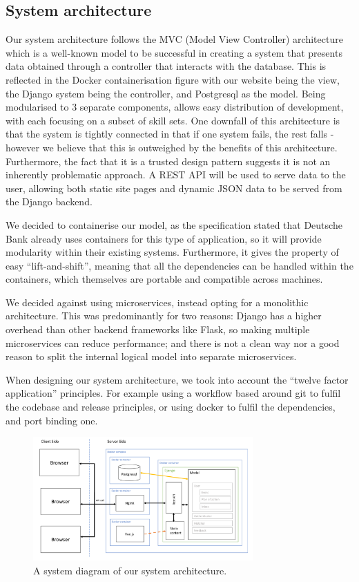 \documentclass[10pt]{article}
\begin{document}
\subsection{System architecture}
Our system architecture follows the MVC (Model View Controller) architecture
which is a well-known model to be successful in creating a system that presents
data obtained through a controller that interacts with the database. This is
reflected in the Docker containerisation figure with our website being the view,
the Django system being the controller, and Postgresql as the model. Being
modularised to 3 separate components, allows easy distribution of development,
with each focusing on a subset of skill sets. One downfall of this architecture
is that the system is tightly connected in that if one system fails, the rest
falls - however we believe that this is outweighed by the benefits of this
architecture. Furthermore, the fact that it is a trusted design pattern suggests
it is not an inherently problematic approach. A REST API will be used to serve
data to the user, allowing both static site pages and dynamic JSON data to be
served from the Django backend.

We decided to containerise our model, as the specification stated that Deutsche
Bank already uses containers for this type of application, so it will provide
modularity within their existing systems. Furthermore, it gives the property of
easy ``lift-and-shift'', meaning that all the dependencies can be handled within
the containers, which themselves are portable and compatible across machines.

We decided against using microservices, instead opting for a monolithic
architecture. This was predominantly for two reasons: Django has a higher
overhead than other backend frameworks like Flask, so making multiple
microservices can reduce performance; and there is not a clean way nor a good
reason to split the internal logical model into separate microservices.

When designing our system architecture, we took into account the ``twelve factor
application'' principles. For example using a workflow based around git to fulfil
the codebase and release principles, or using docker to fulfil the dependencies,
and port binding one.

\begin{figure}[H]
    \centering
    \includegraphics[width=0.75\textwidth]{architecture}
    \caption{A system diagram of our system architecture.}
    \label{fig:system_architecture_diagram}
\end{figure}
\end{document}
